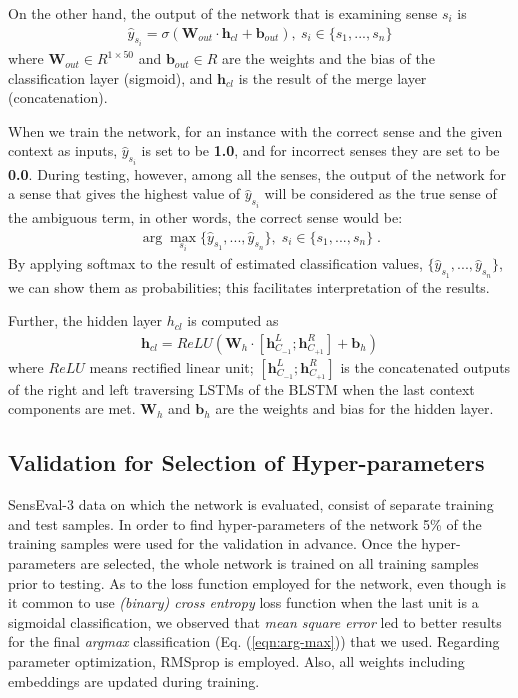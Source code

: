 \documentclass{llncs}
\begin{document}
On the other hand, the output of the network that is examining sense $s_i$ is
\begin{align}
\hat{y}_{s_i} = \sigma( \boldsymbol{W}_{out}\cdot\boldsymbol{h}_{cl}+\boldsymbol{b}_{out}),\: s_i \in \{s_1, ..., s_n\}
\end{align}
where $\boldsymbol{W}_{out}\in R^{1\times 50}$ and $\boldsymbol{b}_{out}\in R$ are the weights and the bias of the classification layer (sigmoid), and $\boldsymbol{h}_{cl}$ is the result of the merge layer (concatenation).

When we train the network, for an instance with the correct sense and the given context as inputs, $\hat{y}_{s_i}$ is set to be \textbf{1.0}, and for incorrect senses they are set to be \textbf{0.0}. During testing, however, among all the senses, the output of the network for a sense that gives the highest value of $\hat{y}_{s_i}$ will be considered as the true sense of the ambiguous term, in other words, the correct sense would be:
\begin{align}
\label{eqn:arg-max}
\arg\max_{s_i}\{\hat{y}_{s_1}, ..., \hat{y}_{s_n}\}, \; s_i \in \{s_1, ..., s_n\}\;.
\end{align}
By applying softmax to the result of estimated classification values, $\{\hat{y}_{s_1}, ..., \hat{y}_{s_n}\}$, we can show them as probabilities; this facilitates interpretation of the results.

Further, the hidden layer ${h}_{cl}$ is computed as
\begin{align}
\label{equation:h}
\boldsymbol{h}_{cl} = ReLU({\boldsymbol{W}_h}\cdot[\boldsymbol{h}_{C_{-1}}^L;\boldsymbol{h}_{C_{+1}}^R]+\boldsymbol{b}_h)
\end{align}
where $ReLU$ means rectified linear unit; $[\boldsymbol{h}_{C_{-1}}^L;\boldsymbol{h}_{C_{+1}}^R]$ is the concatenated outputs of the right and left traversing LSTMs of the BLSTM when the last context components are met. ${\boldsymbol{W}_h}$ and $\boldsymbol{b}_h$ are the weights and bias for the hidden layer.

\subsection{Validation for Selection of Hyper-parameters}
SensEval-3 data \cite{mihalcea2004senseval} on which the network is evaluated, consist of separate training and test samples. In order to find hyper-parameters of the network 5\% of the training samples were used for the validation in advance. Once the hyper-parameters are selected, the whole network is trained on all training samples prior to testing. As to the loss function employed for the network, even though is it common to use \textit{(binary) cross entropy} loss function when the last unit is a sigmoidal classification, we observed that \textit{mean square error} led to better results for the final \textit{argmax} classification (Eq. (\ref{eqn:arg-max})) that we used. Regarding parameter optimization,  RMSprop \cite{hinton2012rmsprop} is employed. Also, all weights including embeddings are updated during training.
\end{document}
